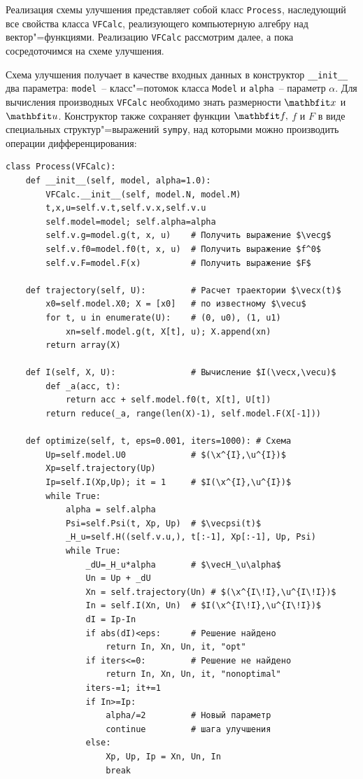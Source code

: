 \documentclass[a4paper,14pt, openany, twoside, final]{extbook} %
\begin{document}
Реализация схемы улучшения представляет собой класс \texttt{Process}, наследующий все свойства класса \texttt{VFCalc}, реализующего компьютерную алгебру над вектор"=функциями.  Реализацию \texttt{VFCalc} рассмотрим далее, а пока сосредоточимся на схеме улучшения.

Схема улучшения получает в качестве входных данных в конструктор \texttt{\_\_init\_\_} два параметра: \texttt{model}~-- класс"=потомок класса \texttt{Model} и \texttt{alpha}~-- параметр $\alpha$.  Для вычисления производных \texttt{VFCalc} необходимо знать размерности $\vecx$ и $\vecu$.  Конструктор также сохраняет функции $\vecf,$ $f$ и $F$ в виде специальных структур"=выражений \texttt{sympy}, над которыми можно производить операции дифференцирования:

\begin{verbatim}
class Process(VFCalc):
    def __init__(self, model, alpha=1.0):
        VFCalc.__init__(self, model.N, model.M)
        t,x,u=self.v.t,self.v.x,self.v.u
        self.model=model; self.alpha=alpha
        self.v.g=model.g(t, x, u)    # Получить выражение $\vecg$
        self.v.f0=model.f0(t, x, u)  # Получить выражение $f^0$
        self.v.F=model.F(x)          # Получить выражение $F$

    def trajectory(self, U):         # Расчет траектории $\vecx(t)$
        x0=self.model.X0; X = [x0]   # по известному $\vecu$
        for t, u in enumerate(U):    # (0, u0), (1, u1)
            xn=self.model.g(t, X[t], u); X.append(xn)
        return array(X)

    def I(self, X, U):               # Вычисление $I(\vecx,\vecu)$
        def _a(acc, t):
            return acc + self.model.f0(t, X[t], U[t])
        return reduce(_a, range(len(X)-1), self.model.F(X[-1]))

    def optimize(self, t, eps=0.001, iters=1000): # Схема
        Up=self.model.U0             # $(\x^{I},\u^{I})$
        Xp=self.trajectory(Up)
        Ip=self.I(Xp,Up); it = 1     # $I(\x^{I},\u^{I})$
        while True:
            alpha = self.alpha
            Psi=self.Psi(t, Xp, Up)  # $\vecpsi(t)$
            _H_u=self.H((self.v.u,), t[:-1], Xp[:-1], Up, Psi)
            while True:
                _dU=_H_u*alpha       # $\vecH_\u\alpha$
                Un = Up + _dU
                Xn = self.trajectory(Un) # $(\x^{I\!I},\u^{I\!I})$
                In = self.I(Xn, Un)  # $I(\x^{I\!I},\u^{I\!I})$
                dI = Ip-In
                if abs(dI)<eps:      # Решение найдено
                    return In, Xn, Un, it, "opt"
                if iters<=0:         # Решение не найдено
                    return In, Xn, Un, it, "nonoptimal"
                iters-=1; it+=1
                if In>=Ip:
                    alpha/=2         # Новый параметр
                    continue         # шага улучшения
                else:
                    Xp, Up, Ip = Xn, Un, In
                    break
\end{verbatim}
\end{document}
